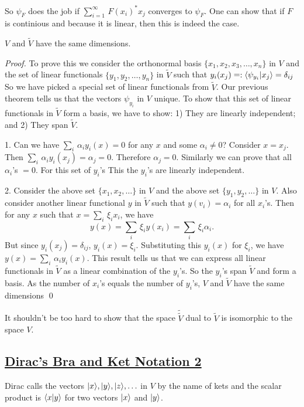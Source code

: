 So $\psi_F$ does the job if $\displaystyle \sum_{i=1}^\infty\, F(x_i)^* x_j$ converges to $\psi_F$. One can show that if $F$ is continious and because it is linear, then this is indeed the case.

\begin{theorem}
$V$ and $\tilde V$ have the same dimensions.
\end{theorem}
\begin{proof}
To prove this we consider the orthonormal basis $\{ x_1, x_2, x_3,\hdots,x_n\}$ in $V$ and the set of linear functionals $\{ y_1, y_2, \hdots, y_n\}$ in $\tilde V$ such that $\displaystyle y_i(x_j) \mathrel{\mathop=}: \langle \psi_{y_i}|x_j\rangle = \delta_{ij}$ 
So we have picked a special set of linear functionals from $\tilde V$. Our previous theorem tells us that the vectors $\psi_{{y_i}}$ in $V$ unique. To show that this set of linear functionals in $\tilde V$ form a basis, we have to show: 
1) They are linearly independent; and 2) They span $\tilde V$.

1. Can we have $\displaystyle \sum_i\, \alpha_i y_i(x) = 0$ for any $x$ and some $\alpha_i \ne 0$? Consider $x=x_j$. Then $\displaystyle \sum_i\, \alpha_i y_i(x_j) = \alpha_j = 0$. Therefore $\alpha_j = 0$. Similarly we can prove that all 
$\alpha_i$'s $= 0$. For this set of $y_i$'s This the $y_i$'s are linearly independent. 

2. Consider the above set $\{ x_1, x_2, \hdots  \}$ in $V$ and the above set $\{  y_1, y_2, \hdots \}$ in $V$. Also consider another linear functional $y$ in $\tilde V$ such that $y(v_i) = \alpha_i$ for all $x_i$'s. Then for any $x$ such that
$\displaystyle x = \sum_i \, \xi_i x_i$, we have 
$$y(x) = \sum_i\, \xi_i y(x_i) = \sum_i\, \xi_i \alpha_i.$$
But since $y_i(x_j) = \delta_{ij}$, $y_i(x) = \xi_i$. Substituting this $y_i(x)$ for $\xi_i$, we have $\displaystyle y(x) = \sum_i\, \alpha_i y_i(x)$. This result tells us that we can express all linear functionals
in $\tilde V$ as a linear combination of the $y_i$'s. So the $y_i$'s span $\tilde V$ and form a basis. As the number of $x_i$'s equals the number of $y_i$'s, $V$ and $\tilde V$ have the same dimensions \qed
\end{proof}

It shouldn't be too hard to show that the space $\tilde{\tilde V}$ dual to $\tilde V$ is isomorphic to the space $V$.

\subsection{\underline{Dirac's Bra and Ket Notation 2}}
Dirac calls the vectors $|x\rangle, |y\rangle, |z\rangle, \hdots$ in $V$ by the name of kets and the scalar product is $\langle x|y\rangle$ for two vectors $|x\rangle$ and $|y\rangle$. 

